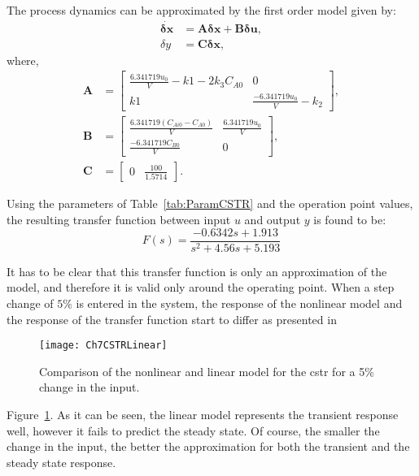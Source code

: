 The process dynamics can be approximated by the first order model given by:
%
\begin{align}
\dot{\mathbf{\delta x}} &=  \mathbf{A}\mathbf{\delta x} + \mathbf{B} \mathbf{\delta u}, \\
%
\delta y &=  \mathbf{C} \mathbf{\delta x},
\end{align}
%
where,
\begin{align*}
	\mathbf{A} &= \left[ \begin{array}{cc} \frac{6.341719 u_0}{V} - k1 - 2 k_3 C_{A0} & 0 \\ k1 & \frac{-6.341719 u_0}{V} - k_2 \end{array}\right],\\
	\mathbf{B} &= \left[ \begin{array}{cc} \frac{6.341719 (C_{Ai0}-C_{A0})}{V} & \frac{6.341719 u_0}{V} \\ \frac{-6.341719 C_{B0}}{V} & 0 \end{array} \right], \\
	\mathbf{C} &= \left[ \begin{array}{cc} 0 & \frac{100}{1.5714} \end{array} \right].
\end{align*}

Using the parameters of Table~\ref{tab:ParamCSTR} and the operation point values, the resulting transfer function between input $u$ and output $y$ is found to be:
\begin{equation}
	F(s) = \frac{-0.6342 s + 1.913}{s^2 + 4.56 s + 5.193}
	\label{eq:TFCSTR}
\end{equation}

It has to be clear that this transfer function is only an approximation of the model, and therefore it is valid only around the operating point. When a step change of $5\%$ is entered in the system, the response of the nonlinear model and the response of the transfer function start to differ as presented in %
%
\begin{figure}[p]
	\centering
	\texttt{[image: Ch7CSTRLinear]}
	\caption{Comparison of the nonlinear and linear model for the \gls{cstr} for a 5\% change in the input.}
	\label{fig:Ch7CSTRLinear}
\end{figure}
%
Figure~\ref{fig:Ch7CSTRLinear}. As it can be seen, the linear model represents the transient response well, however it fails to predict the steady state. Of course, the smaller the change in the input, the better the approximation for both the transient and the steady state response.

